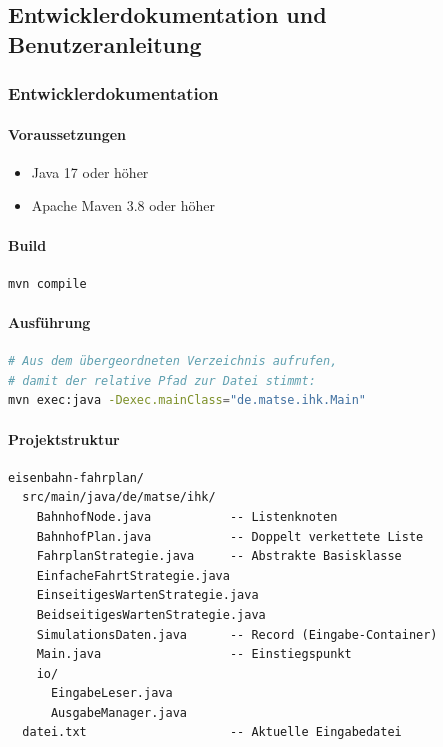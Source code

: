 \documentclass[12pt,a4paper]{article}
\begin{document}
\subsection{Entwicklerdokumentation und Benutzeranleitung}

\subsubsection{Entwicklerdokumentation}

\paragraph{Voraussetzungen}
\begin{itemize}
  \item Java 17 oder höher
  \item Apache Maven 3.8 oder höher
\end{itemize}

\paragraph{Build}
\begin{lstlisting}[language=bash]
mvn compile
\end{lstlisting}

\paragraph{Ausführung}
\begin{lstlisting}[language=bash]
# Aus dem übergeordneten Verzeichnis aufrufen,
# damit der relative Pfad zur Datei stimmt:
mvn exec:java -Dexec.mainClass="de.matse.ihk.Main"
\end{lstlisting}

\paragraph{Projektstruktur}
\begin{lstlisting}
eisenbahn-fahrplan/
  src/main/java/de/matse/ihk/
    BahnhofNode.java           -- Listenknoten
    BahnhofPlan.java           -- Doppelt verkettete Liste
    FahrplanStrategie.java     -- Abstrakte Basisklasse
    EinfacheFahrtStrategie.java
    EinseitigesWartenStrategie.java
    BeidseitigesWartenStrategie.java
    SimulationsDaten.java      -- Record (Eingabe-Container)
    Main.java                  -- Einstiegspunkt
    io/
      EingabeLeser.java
      AusgabeManager.java
  datei.txt                    -- Aktuelle Eingabedatei
\end{lstlisting}
\end{document}

